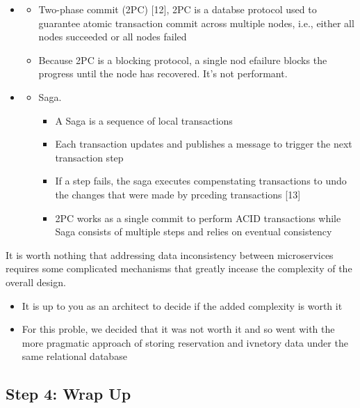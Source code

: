 \documentclass{report}
\theoremstyle{definition}
\let\oldsubsection\subsection
\renewcommand{\subsection}{\oldsubsection*}
\begin{document}
\begin{itemize}
\item

\begin{itemize}
\item
Two-phase commit (2PC) [12], 2PC is a databse protocol used to guarantee atomic transaction commit across multiple nodes, i.e., either all nodes succeeded or all nodes failed
\item
Because 2PC is a blocking protocol, a single nod efailure blocks the progress until the node has recovered. It's not performant.
\end{itemize}

\item

\begin{itemize}
\item
Saga.

\begin{itemize}
\item
A Saga is a sequence of local transactions
\item
Each transaction updates and publishes a message to trigger the next transaction step

\item
If a step fails, the saga executes compenstating transactions to undo the changes that were made by prceding transactions [13]
\item
2PC works as a single commit to perform ACID transactions while Saga consists of multiple steps and relies on eventual consistency
\end{itemize}
\end{itemize}

\end{itemize}

It is worth nothing that addressing data inconsistency between microservices requires some complicated  mechanisms that greatly incease the complexity of the overall design.

\begin{itemize}
\item
It is up to you as an architect to decide if the added complexity is worth it
\item
For this proble, we decided that it was not worth it and so went with the more pragmatic approach of storing reservation and ivnetory data under the same relational database
\end{itemize}

\subsection{Step 4: Wrap Up}
\end{document}

